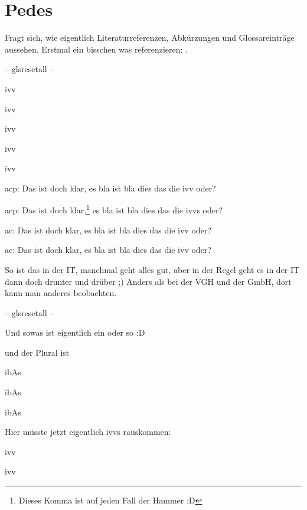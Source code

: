 \section{Pedes}

Fragt sich, wie eigentlich Literaturreferenzen, Abkürzungen und Glossareinträge aussehen. Erstmal
ein bisschen was referenzieren:  
.



-- glsresetall --\glsresetall

\acl{ivv}

\ac{ivv}

\acl{ivv}

\ac{ivv}

\acl{ivv}


acp: Das ist doch klar, es bla ist bla dies das die \ac{ivv} oder?

acp: Das ist doch klar,\footnote{Dieses Komma ist auf jeden Fall der Hammer :D} es bla ist bla dies
das die \acsp{ivv} oder?

ac: Das ist doch klar, es bla ist bla dies das die \ac{ivv} oder?

ac: Das ist doch klar, es bla ist bla dies das die \ac{ivv} oder?

So ist das in der \ac{IT}, manchmal geht alles gut, aber in der Regel geht es in der \ac{IT} dann
doch drunter und drüber ;) Anders als bei der \acs{VGH} und der \ac{GmbH}, dort kann man
anderes beobachten.

-- glsresetall --\glsresetall

Und sowas ist eigentlich ein  oder so :D

 und der Plural ist 

\acp{ibA}

\acsp{ibA}

\acfp{ibA}


Hier müsste jetzt eigentlich ivvs rauskommen: 

\ac{ivv}

\ac{ivv}